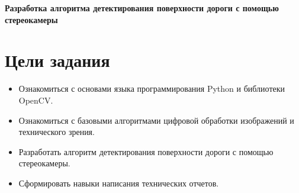 \documentclass[oneside,final,12pt]{scrartcl}
\begin{document}
	\begin{center}
		{\large \textbf{Разработка алгоритма детектирования поверхности дороги с помощью стереокамеры}}
	\end{center}

	\tableofcontents
	\section{Цели задания}
		\begin{itemize}
			\item Ознакомиться с основами языка программирования Python и библиотеки OpenCV.
			\item Ознакомиться с базовыми алгоритмами цифровой обработки изображений и технического зрения.
			\item Разработать алгоритм детектирования поверхности дороги с помощью стереокамеры.
			\item Сформировать навыки написания технических отчетов.
		\end{itemize}
\end{document}
